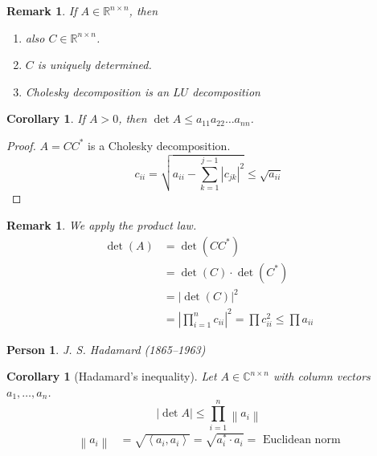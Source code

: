 \documentclass{article}
\newcounter{lecref}[section]
\numberwithin{lecref}{section}
\newtheorem{remark}[lecref]{Remark}
\newtheorem{corollary}[lecref]{Corollary}
\newtheorem*{person}{Person}
\newcommand{\angel}[1]{\left\langle#1\right\rangle}
\newcommand{\norm}[1]{\left\|#1\right\|}
\newcommand{\card}[1]{\left|#1\right|}
\begin{document}
\begin{remark} %
  If $A \in \mathbb R^{n \times n}$, then
  \begin{enumerate}
    \item also $C \in \mathbb R^{n \times n}$.
    \item $C$ is uniquely determined.
    \item Cholesky decomposition is an $LU$ decomposition
  \end{enumerate}
\end{remark}

\begin{corollary} %
  If $A > 0$, then $\det{A} \leq a_{11} a_{22} \dots a_{nn}$.
\end{corollary}

\begin{proof}
  $A = CC^*$ is a Cholesky decomposition.
  \[ c_{ii} = \sqrt{a_{ii} - \sum_{k=1}^{j-1} \card{c_{jk}}^2} \leq \sqrt{a_{ii}} \]
\end{proof}

\begin{remark}
  We apply the product law.
  \begin{align*}
    \det(A) &= \det(C C^*) \\
      &= \det(C) \cdot \det(C^*) \\
      &= \card{\det(C)}^2 \\
      &= \card{\prod_{i=1}^n c_{ii}}^2 = \prod c_{ii}^2 \leq \prod a_{ii}
  \end{align*}
\end{remark}

\begin{person}
  J. S. Hadamard (1865--1963)
\end{person}

\begin{corollary}[Hadamard's inequality] %
  Let $A \in \mathbb C^{n \times n}$ with column vectors $a_1, \dots, a_n$.
  \[ \card{\det{A}} \leq \prod_{i=1}^n \norm{a_{i}} \]
  \begin{align*}
    \norm{a_i} &= \sqrt{\angel{a_i, a_i}} = \sqrt{a_i^* \cdot a_i} = \text{ Euclidean norm}
  \end{align*}
\end{corollary}
\end{document}

